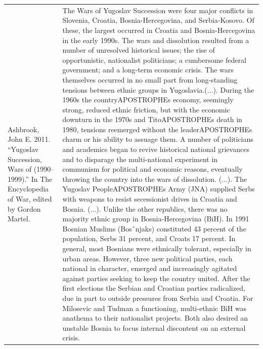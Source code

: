 {\begin{longtable}{p{}p{}}
Ashbrook, John E. 2011. “Yugoslav Succession, Wars of (1990–1999).” In The Encyclopedia of War, edited by Gordon Martel. & The Wars of Yugoslav Succession were four major conflicts in Slovenia, Croatia, Bosnia-Hercegovina, and Serbia-Kosovo. Of these, the largest occurred in Croatia and Bosnia-Hercegovina in the early 1990s. The wars and dissolution resulted from a number of unresolved historical issues; the rise of opportunistic, nationalist politicians; a cumbersome federal government; and a long-term economic crisis. The wars themselves occurred in no small part from long-standing tensions between ethnic groups in Yugoslavia.(...). During the 1960s the countryAPOSTROPHEs economy, seemingly strong, reduced ethnic friction, but with the economic downturn in the 1970s and TitoAPOSTROPHEs death in 1980, tensions reemerged without the leaderAPOSTROPHEs charm or his ability to assuage them. A number of politicians and academics began to revive historical national grievances and to disparage the multi-national experiment in communism for political and economic reasons, eventually throwing the country into the wars of dissolution. (...). The Yugoslav PeopleAPOSTROPHEs Army (JNA) supplied Serbs with weapons to resist secessionist drives in Croatia and Bosnia. (...). Unlike the other republics, there was no majority ethnic group in Bosnia-Hercegovina (BiH). In 1991 Bosnian Muslims (Bosˇnjaks) constituted 43 percent of the population, Serbs 31 percent, and Croats 17 percent. In general, most Bosnians were ethnically tolerant, especially in urban areas. However, three new political parties, each national in character, emerged and increasingly agitated against parties seeking to keep the country united. After the first elections the Serbian and Croatian parties radicalized, due in part to outside pressures from Serbia and Croatia. For Milosevic and Tudman a functioning, multi-ethnic BiH was anathema to their nationalist projects. Both also desired an unstable Bosnia to focus internal discontent on an external crisis.
\\

\end{longtable}}
